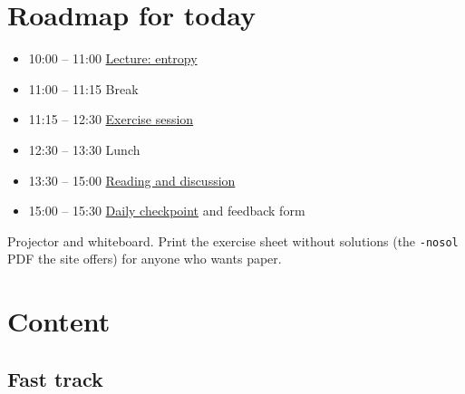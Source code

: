 \documentclass[11pt]{article}
\begin{document}
\section{Roadmap for today}
\label{sec:roadmap}

\begin{itemize}
  \item 10:00 -- 11:00 \hyperref[sec:lecture]{Lecture: entropy}
  \item 11:00 -- 11:15 Break
  \item 11:15 -- 12:30 \hyperref[sec:exercises]{Exercise session}
  \item 12:30 -- 13:30 Lunch
  \item 13:30 -- 15:00 \hyperref[sec:reading]{Reading and discussion}
  \item 15:00 -- 15:30 \hyperref[sec:checkpoint]{Daily checkpoint} and feedback form
\end{itemize}

\begin{teachingnote}
Projector and whiteboard. Print the exercise sheet without solutions
(the \texttt{-nosol} PDF the site offers) for anyone who wants paper.
\end{teachingnote}

\section{Content}
\label{sec:content}

\subsection{Fast track}
\label{sec:fast-track}
\end{document}
